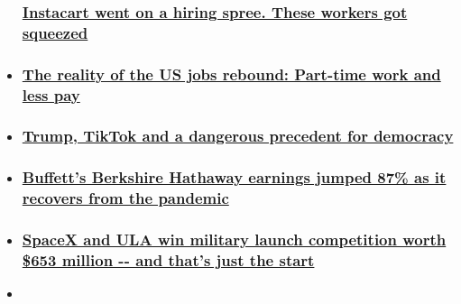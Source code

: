 \begin{itemize}
{  \subsubsection{\texorpdfstring{\href{/2020/08/08/tech/instacart-pandemic-shoppers/index.html}{Instacart
  went on a hiring spree. These workers got
  squeezed}}{Instacart went on a hiring spree. These workers got squeezed}}\label{instacart-went-on-a-hiring-spree-these-workers-got-squeezed}}
\item
  \hypertarget{the-reality-of-the-us-jobs-rebound-part-time-work-and-less-pay}{%
  \subsubsection{\texorpdfstring{\href{/2020/08/08/economy/part-time-work-coronavirus/index.html}{The
  reality of the US jobs rebound: Part-time work and less
  pay}}{The reality of the US jobs rebound: Part-time work and less pay}}\label{the-reality-of-the-us-jobs-rebound-part-time-work-and-less-pay}}
\item
  \hypertarget{trump-tiktok-and-a-dangerous-precedent-for-democracy-}{%
  \subsubsection{\texorpdfstring{\href{/2020/08/08/business/trump-tiktok-democracy-intl/index.html}{Trump,
  TikTok and a dangerous precedent for democracy
  }}{Trump, TikTok and a dangerous precedent for democracy }}\label{trump-tiktok-and-a-dangerous-precedent-for-democracy-}}
\item
  \hypertarget{buffetts-berkshire-hathaway-earnings-jumped-87-as-it-recovers-from-the-pandemic}{%
  \subsubsection{\texorpdfstring{\href{/2020/08/08/business/berkshire-hathaway-warren-buffett-earnings/index.html}{Buffett's
  Berkshire Hathaway earnings jumped 87\% as it recovers from the
  pandemic}}{Buffett's Berkshire Hathaway earnings jumped 87\% as it recovers from the pandemic}}\label{buffetts-berkshire-hathaway-earnings-jumped-87-as-it-recovers-from-the-pandemic}}
\item
  \hypertarget{spacex-and-ula-win-military-launch-competition-worth-653-million----and-thats-just-the-start}{%
  \subsubsection{\texorpdfstring{\href{/2020/08/07/tech/spacex-ula-military-national-security-contract-scn/index.html}{SpaceX
  and ULA win military launch competition worth \$653 million -\/- and
  that's just the
  start}}{SpaceX and ULA win military launch competition worth \$653 million -\/- and that's just the start}}\label{spacex-and-ula-win-military-launch-competition-worth-653-million----and-thats-just-the-start}}
\item
  \hypertarget{americas-economic-recovery-takes-a-hit}{%
}
\end{itemize}
